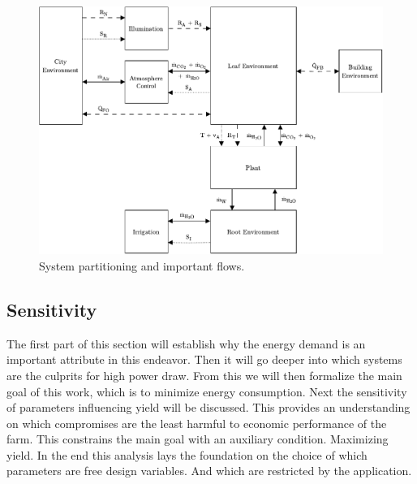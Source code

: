 \begin{figure}[htbp]
  \centering
  \caption{System partitioning and important flows.}
  \label{fig:system-definition}
  \includegraphics[width=\textwidth]{img/context.pdf}
\end{figure}

\subsection{Sensitivity}
The first part of this section will establish why the energy demand is an important attribute in this endeavor.
Then it will go deeper into which systems are the culprits for high power draw.
From this we will then formalize the main goal of this work, which is to minimize energy consumption.
Next the sensitivity of parameters influencing yield will be discussed.
This provides an understanding on which compromises are the least harmful to economic performance of the farm.
This constrains the main goal with an auxiliary condition.
Maximizing yield.
In the end this analysis lays the foundation on the choice of which parameters are free design variables.
And which are restricted by the application.




